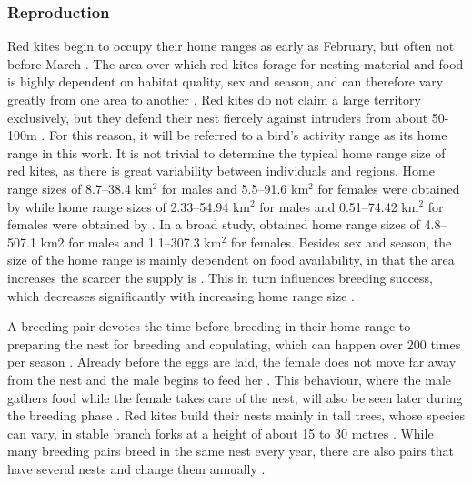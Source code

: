 \subsubsection{Reproduction} \label{reproduction}
Red kites begin to occupy their home ranges as early as February, but often not before March \parencite{aebischer2021rotmilan}. The area over which red kites forage for nesting material and food is highly dependent on habitat quality, sex and season, and can therefore vary greatly from one area to another \parencite{spatz2022sex}. Red kites do not claim a large territory exclusively, but they defend their nest fiercely against intruders from about 50-100m \parencite{aebischer2021rotmilan}. For this reason, it will be referred to a bird's activity range as its home range in this work. It is not trivial to determine the typical home range size of red kites, as there is great variability between individuals and regions. Home range sizes of 8.7--38.4 km$^2$ for males and 5.5--91.6 km$^2$ for females were obtained by \textcite{nachtigall2010aktionsraum} while home range sizes of 2.33--54.94 km$^2$ for males and 0.51--74.42 km$^2$ for females were obtained by \textcite{mammen2013rotmilan}. In a broad study, \textcite{pfeiffer2015gps} obtained home range sizes of 4.8--507.1 km2 for males and 1.1--307.3 km$^2$ for females. Besides sex and season, the size of the home range is mainly dependent on food availability, in that the area increases the scarcer the supply is \parencite{aebischer2021rotmilan, pfeiffer2015gps}. This in turn influences breeding success, which decreases significantly with increasing home range size \parencite{pfeiffer2015gps}.

A breeding pair devotes the time before breeding in their home range to preparing the nest for breeding and copulating, which can happen over 200 times per season \parencite{mougeot2000territorial}. Already before the eggs are laid, the female does not move far away from the nest and the male begins to feed her \parencite{aebischer2021rotmilan}. This behaviour, where the male gathers food while the female takes care of the nest, will also be seen later during the breeding phase \parencite{spatz2021zwischen}. Red kites build their nests mainly in tall trees, whose species can vary, in stable branch forks at a height of about 15 to 30 metres \parencite{aebischer2021rotmilan, mougeot2011breeding}. While many breeding pairs breed in the same nest every year, there are also pairs that have several nests and change them annually \parencite{aebischer2021rotmilan}.

